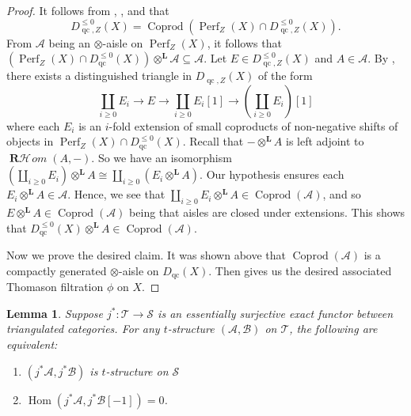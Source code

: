 \documentclass[11pt]{amsart}
\theoremstyle{plain}
\newtheorem{lemma}[theorem]{Lemma}
\theoremstyle{definition}
\numberwithin{equation}{section}
\numberwithin{theorem}{section}
\begin{document}
\begin{proof}
    It follows from \cite[Theorem 3.6]{Lank:2025}, \cite[Example 2.1]{Hrbek/Lank/LeGros/Pavon:2026}, and  that
    \begin{displaymath}
        D^{\leq 0}_{\operatorname{qc},Z}(X) = \operatorname{Coprod}(\operatorname{Perf}_Z (X) \cap D^{\leq 0}_{\operatorname{qc},Z}(X)).
    \end{displaymath}
    From $\mathcal{A}$ being an $\otimes$-aisle on $\operatorname{Perf}_Z (X)$, it follows that $(\operatorname{Perf}_Z (X)\cap D^{\leq 0}_{\operatorname{qc}}(X))\otimes^{\mathbf{L}}\mathcal{A}\subseteq \mathcal{A}$. Let $E\in D^{\leq 0}_{\operatorname{qc},Z}(X)$ and $A\in \mathcal{A}$. By \cite[Theorem 12.1]{Keller/Nicolas:2013}, there exists a distinguished triangle in $D_{\operatorname{qc},Z}(X)$ of the form
    \begin{displaymath}
        \coprod_{i\geq 0} E_i \to E \to \coprod_{i\geq 0} E_i[1] \to (\coprod_{i\geq 0} E_i)[1]
    \end{displaymath}
    where each $E_i$ is an $i$-fold extension of small coproducts of non-negative shifts of objects in $\operatorname{Perf}_Z (X)\cap D^{\leq 0}_{\operatorname{qc}}(X)$. Recall that $-\otimes^{\mathbf{L}} A$ is left adjoint to $\operatorname{\mathbf{R}\mathcal{H}\! \mathit{om}}(A,-)$. So we have an isomorphism $(\coprod_{i\geq 0} E_i)\otimes^{\mathbf{L}} A \cong \coprod_{i\geq 0} (E_i\otimes^{\mathbf{L}} A)$. Our hypothesis ensures each $E_i \otimes^{\mathbf{L}} A\in \mathcal{A}$. Hence, we see that $\coprod_{i\geq 0} E_i\otimes^{\mathbf{L}} A\in \operatorname{Coprod}(\mathcal{A})$, and so $E\otimes^{\mathbf{L}} A\in \operatorname{Coprod}(\mathcal{A})$ being that aisles are closed under extensions. This shows that $D^{\leq 0}_{\operatorname{qc}}(X) \otimes^{\mathbf{L}} A\in \operatorname{Coprod}(\mathcal{A})$. 

    Now we prove the desired claim. It was shown above that $\operatorname{Coprod}(\mathcal{A})$ is a compactly generated $\otimes$-aisle on $D_{\operatorname{qc}}(X)$. Then  gives us the desired associated Thomason filtration $\phi$ on $X$.
\end{proof}

\begin{lemma}\label{lem:induced_t_structure_verdier_localization1}
    Suppose $j^\ast \colon \mathcal{T} \to \mathcal{S}$ is an essentially surjective exact functor between triangulated categories. For any $t$-structure $(\mathcal{A}, \mathcal{B})$ on $\mathcal{T}$, the following are equivalent:
    \begin{enumerate}
        \item $(j^\ast \mathcal{A}, j^\ast \mathcal{B})$ is $t$-structure on $\mathcal{S}$
        \item $\operatorname{Hom}(j^\ast \mathcal{A},j^\ast \mathcal{B}[-1])=0$.
    \end{enumerate}
\end{lemma}
\end{document}
